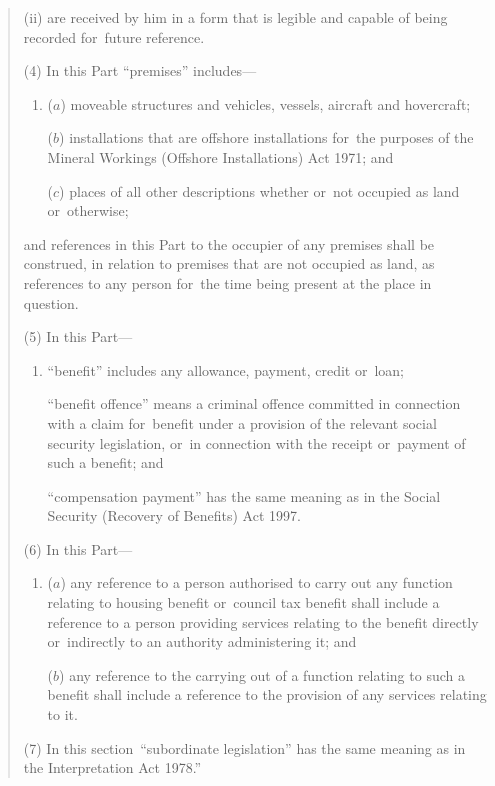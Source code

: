 \documentclass[12pt,a4paper]{article}
\begin{document}
\begin{quotation}
\begin{enumerate}
\begin{enumerate}
(ii) are received by him in a form that is legible and capable of being recorded for~future reference.
\end{enumerate}
\end{enumerate}

(4) In this Part “premises” includes—
\begin{enumerate}\item[]
($a$) moveable structures and vehicles, vessels, aircraft and hovercraft;

($b$) installations that are offshore installations for~the purposes of the Mineral Workings (Offshore Installations) Act 1971; and

($c$) places of all other descriptions whether or~not occupied as land or~otherwise;
\end{enumerate}
and references in this Part to the occupier of any premises shall be construed, in relation to premises that are not occupied as land, as references to any person for~the time being present at the place in question.

(5) In this Part—
\begin{enumerate}\item[]
    “benefit” includes any allowance, payment, credit or~loan;

    “benefit offence” means a criminal offence committed in connection with a claim for~benefit under a provision of the relevant social security legislation, or~in connection with the receipt or~payment of such a benefit; and

    “compensation payment” has the same meaning as in the Social Security (Recovery of Benefits) Act 1997.  
\end{enumerate}

(6) In this Part—
\begin{enumerate}\item[]
($a$) any reference to a person authorised to carry out any function relating to housing benefit or~council tax benefit shall include a reference to a person providing services relating to the benefit directly or~indirectly to an authority administering it; and

($b$) any reference to the carrying out of a function relating to such a benefit shall include a reference to the provision of any services relating to it.
\end{enumerate}

(7) In this section~“subordinate legislation” has the same meaning as in the Interpretation Act 1978.”
\end{quotation}
\end{document}
